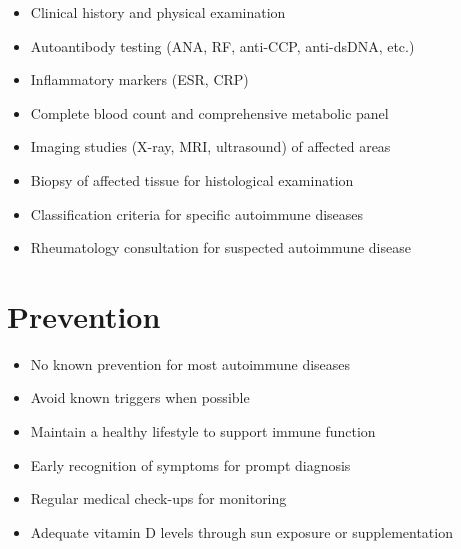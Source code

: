 \begin{itemize}[noitemsep]
  \item Clinical history and physical examination
  \item Autoantibody testing (ANA, RF, anti-CCP, anti-dsDNA, etc.)
  \item Inflammatory markers (ESR, CRP)
  \item Complete blood count and comprehensive metabolic panel
  \item Imaging studies (X-ray, MRI, ultrasound) of affected areas
  \item Biopsy of affected tissue for histological examination
  \item Classification criteria for specific autoimmune diseases
  \item Rheumatology consultation for suspected autoimmune disease
\end{itemize}
\section{Prevention}
\begin{itemize}[noitemsep]
  \item No known prevention for most autoimmune diseases
  \item Avoid known triggers when possible
  \item Maintain a healthy lifestyle to support immune function
  \item Early recognition of symptoms for prompt diagnosis
  \item Regular medical check-ups for monitoring
  \item Adequate vitamin D levels through sun exposure or supplementation
\end{itemize}
